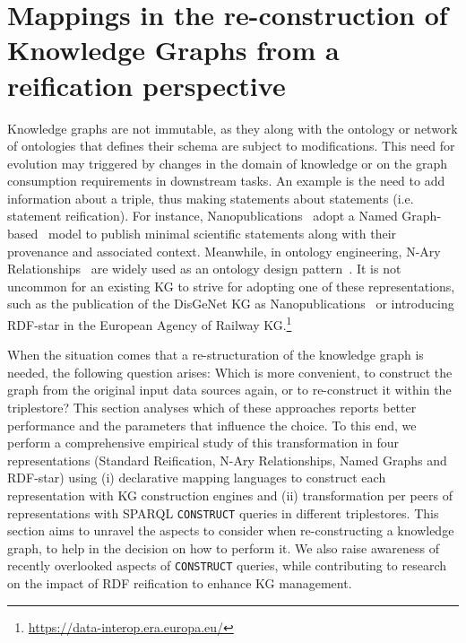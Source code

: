 

\section{Mappings in the re-construction of Knowledge Graphs from a reification perspective}
\label{sec:chp6-1_re-construction}

Knowledge graphs are not immutable, as they along with the ontology or network of ontologies that defines their schema are subject to modifications. This need for evolution may triggered by changes in the domain of knowledge or on the graph consumption requirements in downstream tasks. 
An example is the need to add information about a triple, thus making statements about statements (i.e. statement reification).
For instance, Nanopublications~\cite{groth2010nanopubs} adopt a Named Graph-based~\cite{carroll2005named} model to publish minimal scientific statements along with their provenance and associated context. Meanwhile, in ontology engineering, N-Ary Relationships~\cite{naryw3c2006} are widely used as an ontology design pattern~\cite{gangemi2013multi}. It is not uncommon for an existing KG to strive for adopting one of these representations, such as the publication of the DisGeNet KG as Nanopublications~\cite{queralt2016disgenet} or introducing RDF-star in the European Agency of Railway  KG.\footnote{\url{https://data-interop.era.europa.eu/}}

When the situation comes that a re-structuration of the knowledge graph is needed, the following question arises: Which is more convenient, to construct the graph from the original input data sources again, or to re-construct it within the triplestore? This section analyses which of these approaches reports better performance and the parameters that influence the choice. 
To this end, we perform a comprehensive empirical study of this transformation in four representations (Standard Reification, N-Ary Relationships, Named Graphs and RDF-star) using (i) declarative mapping languages to construct each representation with KG construction engines and (ii) transformation per peers of representations with SPARQL \texttt{CONSTRUCT} queries in different triplestores. This section aims to unravel the aspects to consider when re-constructing a knowledge graph, to help in the decision on how to perform it. We also raise awareness of recently overlooked aspects of \texttt{CONSTRUCT} queries, while contributing to research on the impact of RDF reification to enhance KG management.

